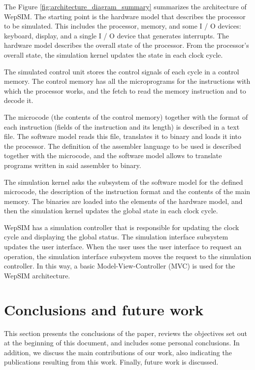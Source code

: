 The Figure \ref{fig:architecture_diagram_summary} summarizes the architecture of WepSIM. The starting point is the hardware model that describes the processor to be simulated. This includes the processor, memory, and some I / O devices: keyboard, display, and a single I / O device that generates interrupts. The hardware model describes the overall state of the processor. From the processor's overall state, the simulation kernel updates the state in each clock cycle.

The simulated control unit stores the control signals of each cycle in a control memory. The control memory has all the microprograms for the instructions with which the processor works, and the fetch to read the memory instruction and to decode it.

The microcode (the contents of the control memory) together with the format of each instruction (fields of the instruction and its length) is described in a text file. The software model reads this file, translates it to binary and loads it into the processor. The definition of the assembler language to be used is described together with the microcode, and the software model allows to translate programs written in said assembler to binary.


The simulation kernel asks the subsystem of the software model for the defined microcode, the description of the instruction format and the contents of the main memory. The binaries are loaded into the elements of the hardware model, and then the simulation kernel updates the global state in each clock cycle.

WepSIM has a simulation controller that is responsible for updating the clock cycle and displaying the global status. The simulation interface subsystem updates the user interface. When the user uses the user interface to request an operation, the simulation interface subsystem moves the request to the simulation controller. In this way, a basic Model-View-Controller (MVC) is used for the WepSIM architecture.

\section*{Conclusions and future work}

This section presents the conclusions of the paper, reviews the objectives set out at the beginning of this document, and includes some personal conclusions. In addition, we discuss the main contributions of our work, also indicating the publications resulting from this work. Finally, future work is discussed.

